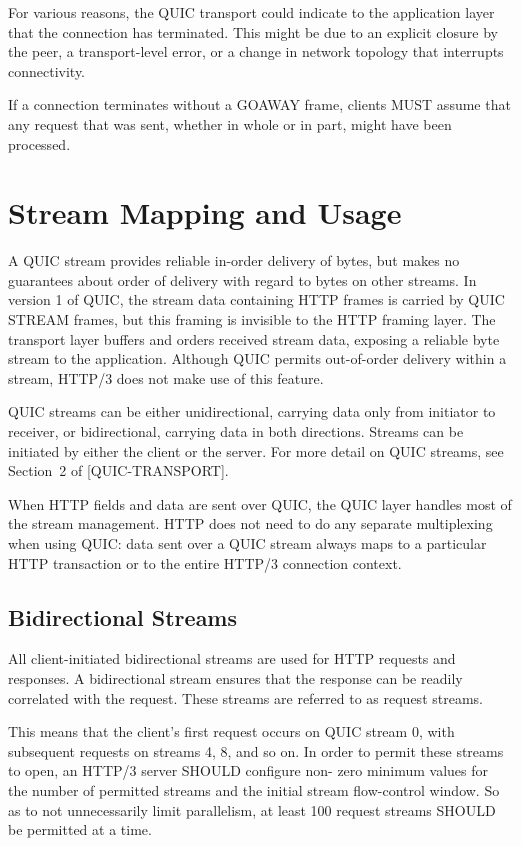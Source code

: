 \documentclass{article}
\begin{document}
For various reasons, the QUIC transport could indicate to the application layer that the connection has terminated.  This might be due to an explicit closure by the peer, a transport-level error, or a change in network topology that interrupts connectivity.

If a connection terminates without a GOAWAY frame, clients MUST assume that any request that was sent, whether in whole or in part, might have been processed.

\section{Stream Mapping and Usage}

A QUIC stream provides reliable in-order delivery of bytes, but makes no guarantees about order of delivery with regard to bytes on other streams.  In version 1 of QUIC, the stream data containing HTTP frames is carried by QUIC STREAM frames, but this framing is invisible to the HTTP framing layer.  The transport layer buffers and orders received stream data, exposing a reliable byte stream to the application.  Although QUIC permits out-of-order delivery within a stream, HTTP/3 does not make use of this feature.

QUIC streams can be either unidirectional, carrying data only from initiator to receiver, or bidirectional, carrying data in both directions.  Streams can be initiated by either the client or the server.  For more detail on QUIC streams, see Section~2 of [QUIC-TRANSPORT].

When HTTP fields and data are sent over QUIC, the QUIC layer handles most of the stream management.  HTTP does not need to do any separate multiplexing when using QUIC: data sent over a QUIC stream always maps to a particular HTTP transaction or to the entire HTTP/3 connection context.

\subsection{Bidirectional Streams}

All client-initiated bidirectional streams are used for HTTP requests and responses.  A bidirectional stream ensures that the response can be readily correlated with the request.  These streams are referred to as request streams.

This means that the client's first request occurs on QUIC stream 0, with subsequent requests on streams 4, 8, and so on.  In order to permit these streams to open, an HTTP/3 server SHOULD configure non- zero minimum values for the number of permitted streams and the initial stream flow-control window.  So as to not unnecessarily limit parallelism, at least 100 request streams SHOULD be permitted at a time.
\end{document}
